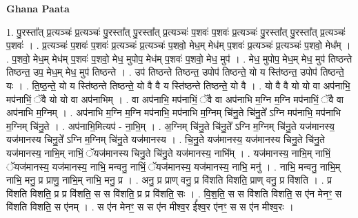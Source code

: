\documentclass[17pt]{extarticle}
\begin{document}
\textbf{Ghana Paata } \newline

1. पु॒रस्ता᳚त् प्र॒त्यञ्चः॑ प्र॒त्यञ्चः॑ पु॒रस्ता᳚त् पु॒रस्ता᳚त् प्र॒त्यञ्चः॑ प॒शवः॑ प॒शवः॑ प्र॒त्यञ्चः॑ पु॒रस्ता᳚त् पु॒रस्ता᳚त् प्र॒त्यञ्चः॑ प॒शवः॑ । . प्र॒त्यञ्चः॑ प॒शवः॑ प॒शवः॑ प्र॒त्यञ्चः॑ प्र॒त्यञ्चः॑ प॒शवो॒ मेध॒म् मेध॑म् प॒शवः॑ प्र॒त्यञ्चः॑ प्र॒त्यञ्चः॑ प॒शवो॒ मेध᳚म् । . प॒शवो॒ मेध॒म् मेध॑म् प॒शवः॑ प॒शवो॒ मेध॒ मुपोप॒ मेध॑म् प॒शवः॑ प॒शवो॒ मेध॒ मुप॑ । . मेध॒ मुपोप॒ मेध॒म् मेध॒ मुप॑ तिष्ठन्ते तिष्ठन्त॒ उप॒ मेध॒म् मेध॒ मुप॑ तिष्ठन्ते । . उप॑ तिष्ठन्ते तिष्ठन्त॒ उपोप॑ तिष्ठन्ते॒ यो य स्ति॑ष्ठन्त॒ उपोप॑ तिष्ठन्ते॒ यः । . ति॒ष्ठ॒न्ते॒ यो य स्ति॑ष्ठन्ते तिष्ठन्ते॒ यो वै वै य स्ति॑ष्ठन्ते तिष्ठन्ते॒ यो वै । . यो वै वै यो यो वा अप॑नाभि॒ मप॑नाभिं॒ ॅवै यो यो वा अप॑नाभिम् । . वा अप॑नाभि॒ मप॑नाभिं॒ ॅवै वा अप॑नाभि म॒ग्नि म॒ग्नि मप॑नाभिं॒ ॅवै वा अप॑नाभि म॒ग्निम् । . अप॑नाभि म॒ग्नि म॒ग्नि मप॑नाभि॒ मप॑नाभि म॒ग्निम् चि॑नु॒ते चि॑नु॒ते᳚ ऽग्नि मप॑नाभि॒ मप॑नाभि म॒ग्निम् चि॑नु॒ते । . अप॑नाभि॒मित्यप॑ - ना॒भि॒म् । . अ॒ग्निम् चि॑नु॒ते चि॑नु॒ते᳚ ऽग्नि म॒ग्निम् चि॑नु॒ते यज॑मानस्य॒ यज॑मानस्य चिनु॒ते᳚ ऽग्नि म॒ग्निम् चि॑नु॒ते यज॑मानस्य । . चि॒नु॒ते यज॑मानस्य॒ यज॑मानस्य चिनु॒ते चि॑नु॒ते यज॑मानस्य॒ नाभि॒म् नाभिं॒ ॅयज॑मानस्य चिनु॒ते चि॑नु॒ते यज॑मानस्य॒ नाभि᳚म् । . यज॑मानस्य॒ नाभि॒म् नाभिं॒ ॅयज॑मानस्य॒ यज॑मानस्य॒ नाभि॒ मन्वनु॒ नाभिं॒ ॅयज॑मानस्य॒ यज॑मानस्य॒ नाभि॒ मनु॑ । . नाभि॒ मन्वनु॒ नाभि॒म् नाभि॒ मनु॒ प्र प्राणु॒ नाभि॒म् नाभि॒ मनु॒ प्र । . अनु॒ प्र प्राण् वनु॒ प्र वि॑शति विशति॒ प्राण् वनु॒ प्र वि॑शति । . प्र वि॑शति विशति॒ प्र प्र वि॑शति॒ स स वि॑शति॒ प्र प्र वि॑शति॒ सः । . वि॒श॒ति॒ स स वि॑शति विशति॒ स ए॑न मेनꣳ॒॒ स वि॑शति विशति॒ स ए॑नम् । . स ए॑न मेनꣳ॒॒ स स ए॑न मीश्व॒र ई᳚श्व॒र ए॑नꣳ॒॒ स स ए॑न मीश्व॒रः । \newline
\end{document}
